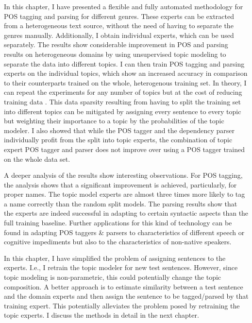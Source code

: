 In this chapter, I have presented a flexible and fully automated methodology for POS tagging and parsing for different genres. These experts can be extracted from a heterogeneous text source, without the need of having to separate the genres manually. Additionally, I obtain individual experts, which can be used separately. The results show considerable improvement in POS and parsing results on heterogeneous domains by using unsupervised topic modeling to separate the data into different topics. I can then train POS tagging and parsing experts on the individual topics, which show an increased accuracy in comparison to their counterparts trained on the whole, heterogenous training set. In theory, I can repeat the experiments for any number of topics but at the cost of reducing training data . This data sparsity resulting from having to split the training set into different topics can be mitigated by assigning every sentence to every topic but weighting their importance to a topic by the probabilities of the topic modeler. I also showed that while the POS tagger and the dependency parser individually profit from the split into topic experts, the combination of topic expert POS tagger and parser does not improve over using a POS tagger trained on the whole data set. 

A deeper analysis of the results show interesting observations. For POS tagging, the analysis shows that a significant improvement is achieved, particularly, for proper names. The topic model experts are almost three times more likely to tag a name correctly than the random split models. The parsing results show that the experts are indeed successful in adapting to certain syntactic aspects than the full training baseline. Further applications for this kind of technology can be found in adapting POS taggers \& parsers to characteristics of different speech or cognitive impediments but also to the characteristics of non-native speakers. 

In this chapter, I have simplified the problem of assigning sentences to the experts. I.e., I retrain the topic modeler for new test sentences. However, since topic modeling is non-parametric, this could potentially change the topic composition. A better approach is to estimate similarity between a test sentence and the domain experts and then assign the sentence to be tagged/parsed by that training expert. This potentially alleviates the problem posed by retraining the topic experts. I discuss the methods in detail in the next chapter.  


